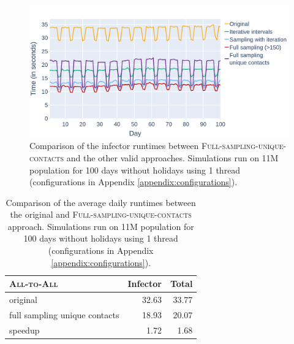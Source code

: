 \begin{figure}
    \centering
    \includegraphics[width=\textwidth]{4 - Sampling/fig/full_sampling_unique_contacts/fsuc_pType_vs_rest_infector.png}
    \caption{Comparison of the infector runtimes between \textsc{Full-sampling-unique-contacts} and the other valid approaches. Simulations run on 11M population for 100 days without holidays using 1 thread (configurations in Appendix \ref{appendix:configurations}).}
    \label{fig:fsuc_pType_vs_rest_infector}
\end{figure}

\begin{table}
    \centering
    \begin{tabular}{@{}lrr@{}}
        \toprule
        \textsc{All-to-All} & Infector & Total \\ \midrule
        original & 32.63 & 33.77 \\
        full sampling unique contacts & 18.93 & 20.07 \\ \hdashline[1pt/1pt]
        speedup & 1.72 & 1.68 \\ \bottomrule
    \end{tabular}
    \caption{Comparison of the average daily runtimes between the original and \textsc{Full-sampling-unique-contacts} approach. Simulations run on 11M population for 100 days without holidays using 1 thread (configurations in Appendix \ref{appendix:configurations}).}
    \label{tab:fsuc_pType_vs_standard_runtimes}
\end{table}

